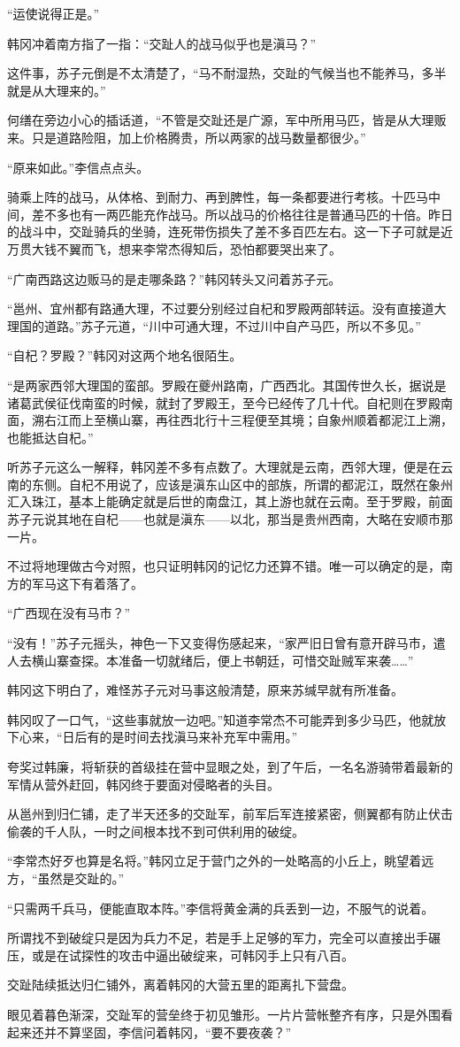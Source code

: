 “运使说得正是。”

韩冈冲着南方指了一指：“交趾人的战马似乎也是滇马？”

这件事，苏子元倒是不太清楚了，“马不耐湿热，交趾的气候当也不能养马，多半就是从大理来的。”

何缮在旁边小心的插话道，“不管是交趾还是广源，军中所用马匹，皆是从大理贩来。只是道路险阻，加上价格腾贵，所以两家的战马数量都很少。”

“原来如此。”李信点点头。

骑乘上阵的战马，从体格、到耐力、再到脾性，每一条都要进行考核。十匹马中间，差不多也有一两匹能充作战马。所以战马的价格往往是普通马匹的十倍。昨日的战斗中，交趾骑兵的坐骑，连死带伤损失了差不多百匹左右。这一下子可就是近万贯大钱不翼而飞，想来李常杰得知后，恐怕都要哭出来了。

“广南西路这边贩马的是走哪条路？”韩冈转头又问着苏子元。

“邕州、宜州都有路通大理，不过要分别经过自杞和罗殿两部转运。没有直接道大理国的道路。”苏子元道，“川中可通大理，不过川中自产马匹，所以不多见。”

“自杞？罗殿？”韩冈对这两个地名很陌生。

“是两家西邻大理国的蛮部。罗殿在夔州路南，广西西北。其国传世久长，据说是诸葛武侯征伐南蛮的时候，就封了罗殿王，至今已经传了几十代。自杞则在罗殿南面，溯右江而上至横山寨，再往西北行十三程便至其境；自象州顺着都泥江上溯，也能抵达自杞。”

听苏子元这么一解释，韩冈差不多有点数了。大理就是云南，西邻大理，便是在云南的东侧。自杞不用说了，应该是滇东山区中的部族，所谓的都泥江，既然在象州汇入珠江，基本上能确定就是后世的南盘江，其上游也就在云南。至于罗殿，前面苏子元说其地在自杞——也就是滇东——以北，那当是贵州西南，大略在安顺市那一片。

不过将地理做古今对照，也只证明韩冈的记忆力还算不错。唯一可以确定的是，南方的军马这下有着落了。

“广西现在没有马市？”

“没有！”苏子元摇头，神色一下又变得伤感起来，“家严旧日曾有意开辟马市，遣人去横山寨查探。本准备一切就绪后，便上书朝廷，可惜交趾贼军来袭……”

韩冈这下明白了，难怪苏子元对马事这般清楚，原来苏缄早就有所准备。

韩冈叹了一口气，“这些事就放一边吧。”知道李常杰不可能弄到多少马匹，他就放下心来，“日后有的是时间去找滇马来补充军中需用。”

夸奖过韩廉，将斩获的首级挂在营中显眼之处，到了午后，一名名游骑带着最新的军情从营外赶回，韩冈终于要面对侵略者的头目。

从邕州到归仁铺，走了半天还多的交趾军，前军后军连接紧密，侧翼都有防止伏击偷袭的千人队，一时之间根本找不到可供利用的破绽。

“李常杰好歹也算是名将。”韩冈立足于营门之外的一处略高的小丘上，眺望着远方，“虽然是交趾的。”

“只需两千兵马，便能直取本阵。”李信将黄金满的兵丢到一边，不服气的说着。

所谓找不到破绽只是因为兵力不足，若是手上足够的军力，完全可以直接出手碾压，或是在试探性的攻击中逼出破绽来，可韩冈手上只有八百。

交趾陆续抵达归仁铺外，离着韩冈的大营五里的距离扎下营盘。

眼见着暮色渐深，交趾军的营垒终于初见雏形。一片片营帐整齐有序，只是外围看起来还并不算坚固，李信问着韩冈，“要不要夜袭？”

